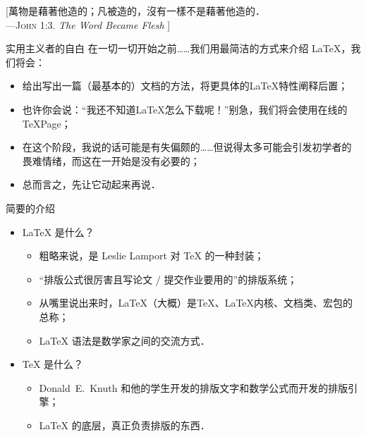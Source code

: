 [\NotoSerifCJKTC 萬物是藉著他造的；凡被造的，沒有一樣不是藉著他造的．\\\mbox{}\hfill ---\textsc{John 1:3}. \emph{The Word Became Flesh}%
]

\begin{frame}{实用主义者的自白}
	\pause 在一切一切开始之前……我们用最简洁的方式来介绍 \LaTeX{}，我们将会：\pause
	\begin{itemize}
		\item<+-> 给出写出一篇（最基本的）文档的方法，将更具体的\LaTeX{}特性阐释后置；
		\item<+-> 也许你会说：“\alert{我还不知道\LaTeX{}怎么下载呢！}”别急，我们将会使用在线的 TeXPage；
		\item<+-> 在这个阶段，我说的话可能是有失偏颇的……但说得太多可能会引发初学者的畏难情绪，而这在一开始是没有必要的；
		\item<+-> 总而言之，先让它动起来再说．
	\end{itemize}
\end{frame}

\begin{frame}{简要的介绍}
    \begin{itemize}
        \item<+-> \LaTeX{} 是什么？
        \begin{itemize}
            \item<+-> 粗略来说，是 Leslie Lamport 对 \TeX{} 的一种封装；
            \item<+-> “排版公式很厉害且写论文 / 提交作业要用的”的排版系统；
            \item<+-> 从嘴里说出来时，\LaTeX{}（大概）是\TeX{}、\LaTeX{}内核、文档类、宏包的总称；
            \item<+-> \LaTeX{} 语法是数学家之间的交流方式．
        \end{itemize}
        \item<+-> \TeX{} 是什么？
        \begin{itemize}
            \item<+-> Donald~E.\ Knuth 和他的学生开发的排版文字和数学公式而开发的排版引擎；
            \item<+-> \LaTeX{} 的底层，真正负责排版的东西．
        \end{itemize}
    \end{itemize}
\end{frame}



